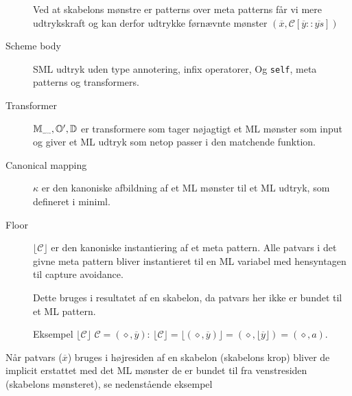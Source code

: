 \documentclass[oneside]{memoir}
\newcommand{\floor}[1]{\ensuremath{\lfloor #1 \rfloor}}
\theoremstyle{definition}
\begin{document}
\begin{description}
  Ved at skabelons mønstre er patterns over meta patterns får vi mere
  udtrykskraft og kan derfor udtrykke førnævnte mønster $(\overline{x},
  \mathcal{C}[\overline{y} :: \overline{ys}])$


\item[Scheme body] SML udtryk uden type annotering, infix operatorer, Og
  \texttt{self}, meta patterns og transformers.


\item[Transformer] %
  $\mathbb{M}_{\textnormal{\fontsize{2}{3pt}\selectfont egatron}}, \mathbb{O}',
  \mathbb{D}$ er transformere som tager nøjagtigt et ML mønster som input og
  giver et ML udtryk som netop passer i den matchende funktion. 


\item[Canonical mapping] $\kappa$ er den kanoniske afbildning af et ML mønster
  til et ML udtryk, som defineret i miniml.


\item[Floor] $\floor{\mathcal{C}}$ er den kanoniske instantiering af et meta
  pattern. Alle patvars i det givne meta pattern bliver instantieret til en ML
  variabel med hensyntagen til capture avoidance.

  Dette bruges i resultatet af en skabelon, da patvars her ikke er bundet til et
  ML pattern.

  Eksempel $\floor{\mathcal{C}}$ $\mathcal{C} = (\diamond, \overline{y})$:
  $\floor{\mathcal{C}} = \floor{(\diamond, \overline{y})} = (\diamond,
  \floor{\overline{y}}) = (\diamond, a)$.
 
\end{description}

Når patvars ($\overline{x}$) bruges i højresiden af en skabelon (skabelons krop)
bliver de implicit erstattet med det ML mønster de er bundet til fra
venstresiden (skabelons mønsteret), se nedenstående eksempel
\end{document}
